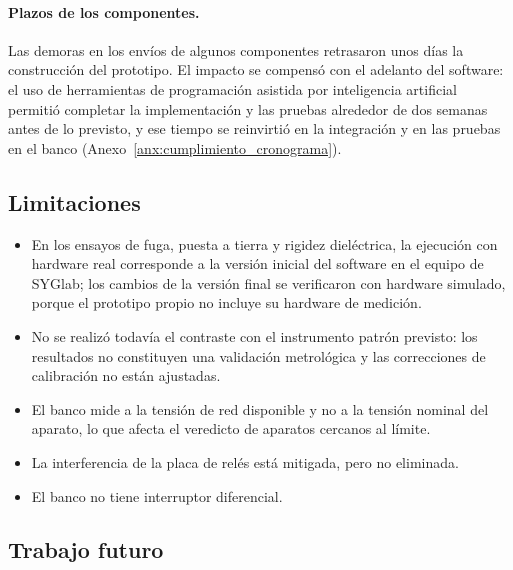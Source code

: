 \paragraph{Plazos de los componentes.}
Las demoras en los envíos de algunos componentes retrasaron unos días la
construcción del prototipo. El impacto se compensó con el adelanto del software:
el uso de herramientas de programación asistida por inteligencia artificial
permitió completar la implementación y las pruebas alrededor de dos semanas antes
de lo previsto, y ese tiempo se reinvirtió en la integración y en las pruebas en
el banco (Anexo~\ref{anx:cumplimiento_cronograma}).

\subsection{Limitaciones}

\begin{itemize}
    \item En los ensayos de fuga, puesta a tierra y rigidez dieléctrica, la
          ejecución con hardware real corresponde a la versión inicial del
          software en el equipo de SYGlab; los cambios de la versión final se
          verificaron con hardware simulado, porque el prototipo propio no
          incluye su hardware de medición.
    \item No se realizó todavía el contraste con el instrumento patrón
          previsto: los resultados no constituyen
          una validación metrológica y las correcciones de calibración no están
          ajustadas.
    \item El banco mide a la tensión de red disponible y no a la tensión nominal
          del aparato, lo que afecta el veredicto de aparatos cercanos al límite.
    \item La interferencia de la placa de relés está mitigada, pero no eliminada.
    \item El banco no tiene interruptor diferencial.
\end{itemize}

\subsection{Trabajo futuro}


